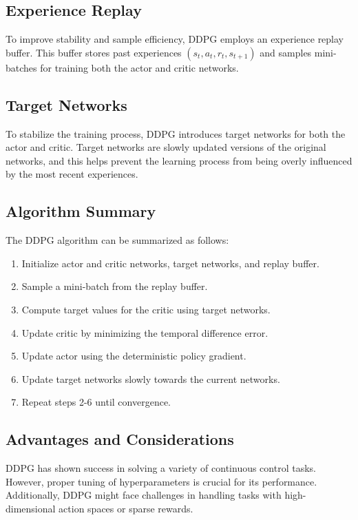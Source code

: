 \documentclass[conference]{IEEEtran}
\begin{document}
\subsection{Experience Replay}

To improve stability and sample efficiency, DDPG employs an experience replay buffer. This buffer stores past experiences $(s_t, a_t, r_t, s_{t+1})$ and samples mini-batches for training both the actor and critic networks.

\subsection{Target Networks}

To stabilize the training process, DDPG introduces target networks for both the actor and critic. Target networks are slowly updated versions of the original networks, and this helps prevent the learning process from being overly influenced by the most recent experiences.

\subsection{Algorithm Summary}

The DDPG algorithm can be summarized as follows:

\begin{enumerate}
  \item Initialize actor and critic networks, target networks, and replay buffer.
  \item Sample a mini-batch from the replay buffer.
  \item Compute target values for the critic using target networks.
  \item Update critic by minimizing the temporal difference error.
  \item Update actor using the deterministic policy gradient.
  \item Update target networks slowly towards the current networks.
  \item Repeat steps 2-6 until convergence.
\end{enumerate}

\subsection{Advantages and Considerations}

DDPG has shown success in solving a variety of continuous control tasks. However, proper tuning of hyperparameters is crucial for its performance. Additionally, DDPG might face challenges in handling tasks with high-dimensional action spaces or sparse rewards.
\end{document}
